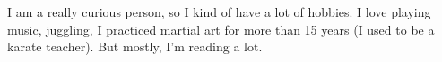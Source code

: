 

\begin{cvparagraph}

I am a really curious person, so I kind of have a lot of hobbies.
I love playing music, juggling, I practiced martial art for more than 15 years (I used to be a karate teacher).
But mostly, I'm reading a lot.

\end{cvparagraph}
